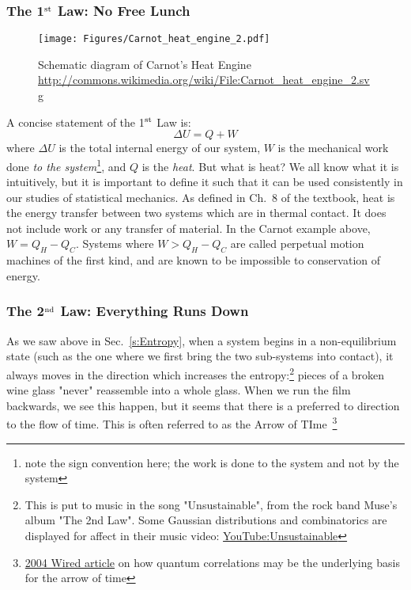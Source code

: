 \subsubsection{The 1$^{\rm st}$ Law: No Free Lunch}
\begin{figure}[h]
\centering
\texttt{[image: Figures/Carnot\_heat\_engine\_2.pdf]}
\caption{Schematic diagram of Carnot's Heat Engine \\
	\url{http://commons.wikimedia.org/wiki/File:Carnot_heat_engine_2.svg}}
\end{figure}
A concise statement of the 1$^{\rm st}$ Law is:
\begin{equation}
\Delta U = Q + W
\label{eq:FirstLaw}
\end{equation}
where $\Delta U$ is the total internal energy of our system, $W$ is the
mechanical work done \emph{to the system}\footnote{note the sign convention
here; the work is done to the system and not by the system}, and $Q$ is
the \textit{heat}. But what is heat? We all know what it is intuitively,
but it is important to define it such that it can be used consistently in
our studies of statistical mechanics. As defined in Ch.~8 of the textbook,
heat is the energy transfer between two systems which are in thermal contact.
It does not include work or any transfer of material. In the Carnot example
above, $W = Q_H - Q_C$. Systems where $W > Q_H - Q_C$ are called
perpetual motion machines of the first kind, and are known to be
impossible to conservation of energy.

\subsubsection{The 2$^{\rm nd}$ Law: Everything Runs Down}
As we saw above in Sec.~\ref{s:Entropy}, when a system begins in a
non-equilibrium state (such as the one where we first bring the two
sub-systems into contact), it always moves in the direction which
increases the entropy:\footnote{This is put to music in the song "Unsustainable", from the rock band Muse's album "The 2nd Law". Some Gaussian distributions and combinatorics are displayed for affect in their music video:
\href{https://www.youtube.com/watch?v=EF_xdvn52As}{YouTube:Unsustainable}} pieces of a broken wine glass "never" reassemble
into a whole glass. When we run the film backwards, we see this happen,
but it seems that there is a preferred to direction to the 
flow of time. This is often referred to as the 
Arrow of TIme~\footnote{\href{http://www.wired.com/2014/04/quantum-theory-flow-time/}{2004 Wired article} on how quantum correlations may be the underlying basis for the arrow of time}

